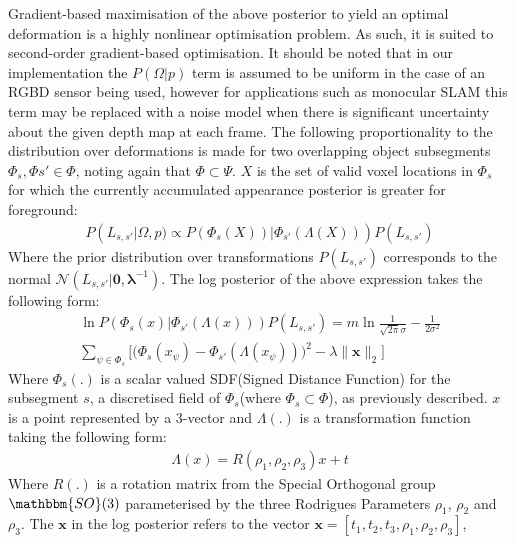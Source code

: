 Gradient-based maximisation of the above posterior to yield an optimal deformation is a highly nonlinear optimisation problem. As such, it is suited 
to second-order gradient-based optimisation.
It should be noted that in our implementation the $P(\Omega | p)$ term is assumed to be uniform in the case of an 
RGBD sensor being used, however for applications such as monocular SLAM this term may be replaced with a noise model when there is 
significant uncertainty about the given depth map at each frame.
The following proportionality to the distribution over deformations is made for two overlapping object subsegments $\Phi_{s}, \Phi{s'} \in \Phi$, noting again that 
$\Phi \subset \Psi$. $X$ is the set of valid voxel locations in $\Phi_{s}$ for which the currently accumulated appearance posterior is greater for foreground:
\begin{equation}
\begin{split}
P(L_{s, s'} | \Omega, p) \propto P(\Phi_{s}(X)) | \Phi_{s'}(\Lambda(X)))P(L_{s, s'})
\end{split}
\end{equation}
Where the prior distribution over transformations $P(L_{s, s'})$ corresponds to the normal $\mathcal{N}(L_{s, s'} | \mathbf{0}, \mathbf{\lambda}^{-1})$.
The log posterior of the above expression takes the following form:
\begin{equation}
\begin{split}
\ln P(\Phi_{s}(x) | \Phi_{s'}(\Lambda(x)))P(L_{s, s'}) = m\ln\frac{1}{\sqrt{2\pi}\sigma} -\frac{1}{2\sigma^2} \\ 
\sum_{\psi \in \Phi_{s}} \Bigg [ \bigg( \Phi_{s}(x_{\psi}) - \Phi_{s'}(\Lambda(x_{\psi})) \bigg)^2  - \lambda \lVert \mathbf{\mathbf{x}} \rVert_{2} \Bigg ]
\end{split}
\end{equation}
Where $\Phi_{s}(.)$ is a scalar valued SDF(Signed Distance Function) for the subsegment $s$, a discretised field of $\Phi_{s}$(where $\Phi_{s} \subset \Phi$), as previously described. $x$ is a point represented by a 3-vector and $\Lambda(.)$ is a transformation function taking the following form:
\begin{equation}
\begin{split}
\Lambda(x) = R(\rho_{1}, \rho_{2}, \rho_{3})x + t
\end{split}
\end{equation}
Where $R(.)$ is a rotation matrix from the Special Orthogonal group $\mathbbm{SO}(3)$ parameterised by the three 
Rodrigues Parameters \cite{Shuster1993} $\rho_{1}$, $\rho_{2}$ and $\rho_{3}$. The $\mathbf{x}$ in the log posterior refers to the vector $\mathbf{x} = [t_{1}, t_{2}, t_{3}, \rho_{1}, \rho_{2}, \rho_{3}]$, 
